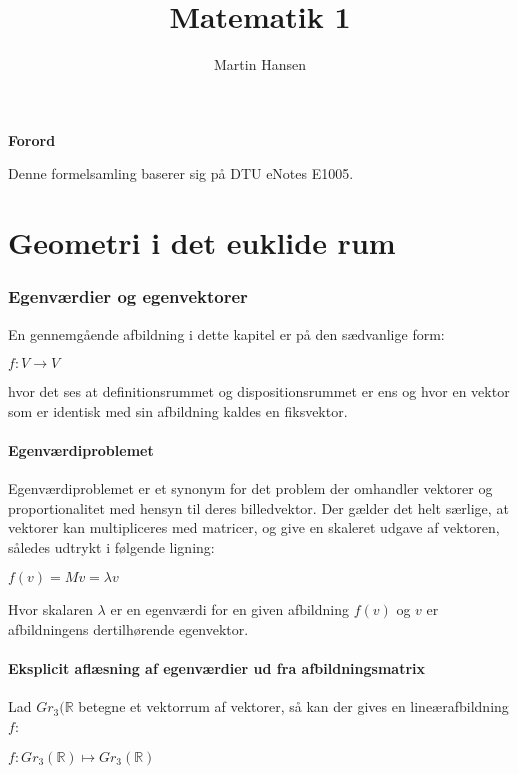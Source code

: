 \documentclass{article}
\author{Martin Hansen}
\title{Matematik 1}
\newcommand{\cent}[1]{\begin{center}#1\end{center}}
\begin{document}
	
	\maketitle
	\begin{center}
		\Large \textbf{Forord}
		
		Denne formelsamling baserer sig på DTU eNotes E1005.
	\end{center}
	\pagebreak
	\tableofcontents
	\pagebreak
	\part{\textbf{Geometri i det euklide rum}}
	
	\section{Egenværdier og egenvektorer}
	
	En gennemgående afbildning i dette kapitel er på den sædvanlige form:
	
	\cent{$ f:V \rightarrow V $}
	
	hvor det ses at definitionsrummet og dispositionsrummet er ens og hvor en vektor som er identisk med sin afbildning kaldes en fiksvektor. 
	
	\subsection{Egenværdiproblemet}
	
	Egenværdiproblemet er et synonym for det problem der omhandler vektorer og proportionalitet med hensyn til deres billedvektor. Der gælder det helt særlige, at vektorer kan multipliceres med matricer, og give en skaleret udgave af vektoren, således udtrykt i følgende ligning:
	
	\cent{$ f(v)=Mv=\lambda v $}
	
	Hvor skalaren $\lambda$ er en egenværdi for en given afbildning $f(v)$ og $v$ er afbildningens dertilhørende egenvektor.
	
	\subsection*{Eksplicit aflæsning af egenværdier ud fra afbildningsmatrix}
	
	
	Lad $Gr_3(\mathbb{R}$ betegne et vektorrum af vektorer, så kan der gives en lineærafbildning $f$:
	
	\cent{$f : Gr_3(\mathbb{R})\mapsto Gr_3(\mathbb{R})$ }
	
\end{document}
